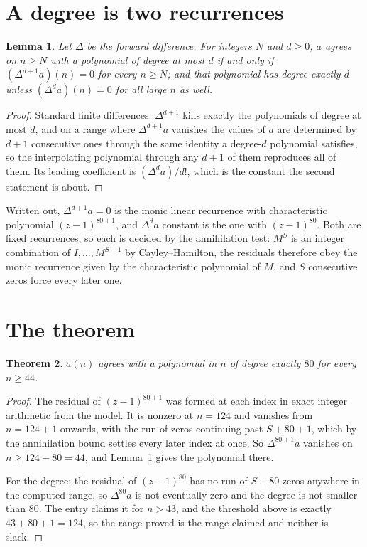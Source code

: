 \documentclass[11pt,a4paper]{article}
\theoremstyle{plain}
\newtheorem{theorem}{Theorem}
\newtheorem{lemma}[theorem]{Lemma}
\theoremstyle{definition}
\begin{document}
\section{A degree is two recurrences}

\begin{lemma}\label{lem:diff}
Let $\Delta$ be the forward difference. For integers $N$ and $d\ge0$, $a$ agrees on
$n\ge N$ with a polynomial of degree at most $d$ if and only if $(\Delta^{d+1}a)(n)=0$ for
every $n\ge N$; and that polynomial has degree exactly $d$ unless $(\Delta^{d}a)(n)=0$ for
all large $n$ as well.
\end{lemma}

\begin{proof}
Standard finite differences. $\Delta^{d+1}$ kills exactly the polynomials of degree at most
$d$, and on a range where $\Delta^{d+1}a$ vanishes the values of $a$ are determined by
$d+1$ consecutive ones through the same identity a degree-$d$ polynomial satisfies, so the
interpolating polynomial through any $d+1$ of them reproduces all of them. Its leading
coefficient is $(\Delta^{d}a)/d!$, which is the constant the second statement is about.
\end{proof}

Written out, $\Delta^{d+1}a=0$ is the monic linear recurrence with characteristic polynomial
$(z-1)^{80+1}$, and $\Delta^{d}a$ constant is the one with $(z-1)^{80}$. Both are
fixed recurrences, so each is decided by the annihilation test: $M^{S}$ is an integer
combination of $I,\dots,M^{S-1}$ by Cayley--Hamilton, the residuals therefore obey the monic
recurrence given by the characteristic polynomial of $M$, and $S$ consecutive zeros force every
later one.

\section{The theorem}

\begin{theorem}
$a(n)$ agrees with a polynomial in $n$ of degree exactly $80$ for every $n\ge44$.
\end{theorem}

\begin{proof}
The residual of $(z-1)^{80+1}$ was formed at each index in exact integer arithmetic from
the model. It is nonzero at $n=124$ and vanishes from $n=124+1$ onwards, with the run of
zeros continuing past $S+80+1$, which by the annihilation bound settles every later index at
once. So $\Delta^{80+1}a$ vanishes on $n\ge124-80=44$, and
Lemma~\ref{lem:diff} gives the polynomial there.

For the degree: the residual of $(z-1)^{80}$ has no run of $S+80$ zeros anywhere in the
computed range, so $\Delta^{80}a$ is not eventually zero and the degree is not smaller
than $80$. The entry claims it for $n>43$, and the threshold above is exactly $43+80+1=124$, so the range proved is the range claimed and neither is slack.
\end{proof}
\end{document}
